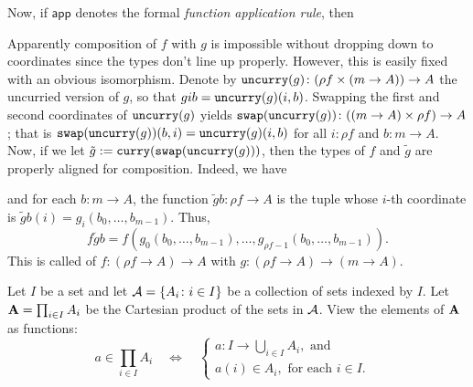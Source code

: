 \documentclass[12pt]{amsart}  %
\begin{document}
Now, if  $\mathsf{app}$ denotes the formal \emph{function application rule}, then
\begin{prooftree}
\end{prooftree}
\begin{prooftree}
\end{prooftree}
Apparently composition of $f$ with $g$ is impossible without dropping down to coordinates
since the types don't line up properly. 
However, this is easily fixed with an obvious isomorphism. 
Denote by $\uncurry{g} \colon (\rho f \times (m \to A)) \to A$
the uncurried version of $g$, so that $gib = \uncurry{g}(i,b)$.
Swapping the first and second coordinates of $\uncurry{g}$ yields
$\swap{\uncurry{g}} \colon ((m\to A) \times \rho f) \to A$; that is  
$\swap{\uncurry{g}}(b,i) = \uncurry{g} (i,b)$ for all $i \colon \rho f$ and $b \colon m \to A$.  
Now, if we let $\tilde{g} := \curry{\swap{\uncurry{g}}}$, then the types of $f$ and $\tilde{g}$ 
are properly aligned for composition.
Indeed, we have
\begin{prooftree}
\end{prooftree}
and for each $b \colon m \to A$, the function $\tilde{g}b \colon \rho f \to A$ is the tuple 
whose $i$-th coordinate is $\tilde{g}b(i) = g_i(b_0, \dots, b_{m-1})$. Thus,
\[
  f\tilde{g} b = f(g_0 (b_0, \dots, b_{m-1}), \dots, g_{\rho f -1}(b_0, \dots, b_{m-1})).
  \]
This is called  of $f : (\rho f \to A) \to A$ with 
$g \colon (\rho f \to A) \to (m \to A)$.
    

Let $I$ be a set and let $\sA = \{A_i \colon i \in I\}$ be
a collection of sets indexed by $I$.
Let $\alg{A} = \prod_{i\in I} A_i$ be the Cartesian product of 
the sets in $\sA$. 
View the elements of $\alg{A}$ as functions:
\begin{equation}
  \label{eq:7}
  a \in \prod_{i\in I} A_i \quad \iff
  \quad 
  \begin{cases}
    a\colon I \rightarrow \bigcup_{i\in I} A_i, \text{ and }&\\
    a(i) \in A_i, \text{ for each $i\in I$.} &  
  \end{cases}
\end{equation}
\end{document}
